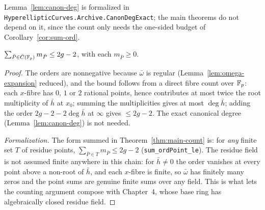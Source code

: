 \begin{remark}[Formalization]
Lemma~\ref{lem:canon-deg} is formalized in
\texttt{HyperellipticCurves.Archive.CanonDegExact}; the main theorems do not depend on it,
since the count only needs the one-sided budget of Corollary~\ref{cor:sum-ord}.
\end{remark}

\begin{corollary}
\label{cor:sum-ord}
\leanok
{}
$\sum_{\bar P \in \bar C(\mathbb{F}_p)} m_{\bar P} \le 2g - 2$, with each $m_{\bar P} \ge 0$.
\end{corollary}
\begin{proof}
\leanok
The orders are nonnegative because $\bar\omega$ is regular
(Lemma~\ref{lem:omega-expansion} reduced), and the bound follows from a direct fibre
count over $\mathbb{F}_p$: each $x$-fibre has $0$, $1$ or $2$ rational points, hence contributes
at most twice the root multiplicity of $\bar h$ at $x_0$; summing the multiplicities
gives at most $\deg \bar h$; adding the order $2g - 2 - 2\deg\bar h$ at $\infty$ gives
$\le 2g-2$. The exact canonical degree (Lemma~\ref{lem:canon-deg}) is not needed.

\emph{Formalization.} The form summed in Theorem~\ref{thm:main-count} is: for \emph{any}
finite set $T$ of residue points, $\sum_{\bar P \in T} m_{\bar P} \le 2g-2$
(\texttt{sum\_ordPoint\_le}). The residue field is not assumed finite anywhere in this
chain: for $\bar h \neq 0$ the order vanishes at every point above a non-root of
$\bar h$, and each $x$-fibre is finite, so $\bar\omega$ has finitely many zeros and the
point sums are genuine finite sums over any field. This is what lets the counting
argument compose with Chapter~4, whose base ring has algebraically closed residue
field.
\end{proof}

